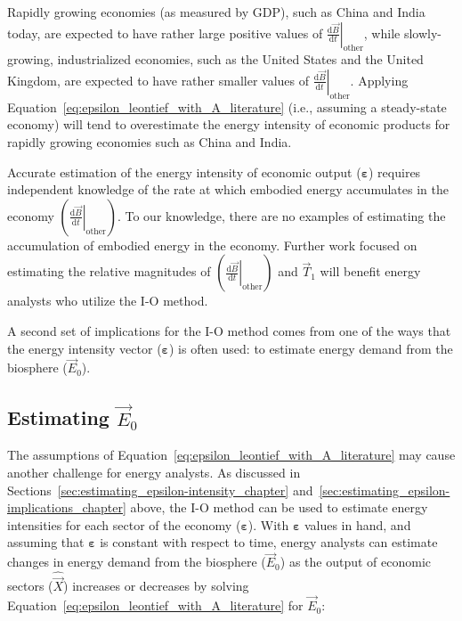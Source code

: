 Rapidly growing economies (as measured by GDP), such as China and India today,
are expected to have rather large positive values of 
$\left. \frac{\mathrm{d}\vec{B}}{\mathrm{d}t} \right|_{\mathrm{other}}$,
while slowly-growing, industrialized economies, 
such as the United States and the United Kingdom,
are expected to have rather smaller values of 
$\left. \frac{\mathrm{d}\vec{B}}{\mathrm{d}t} \right|_{\mathrm{other}}$.
Applying Equation~\ref{eq:epsilon_leontief_with_A_literature} 
(i.e., assuming a steady-state economy)
will tend to overestimate the energy intensity 
of economic products for rapidly growing economies such as China and India.

Accurate estimation of the energy intensity of economic output ($\bm{\varepsilon}$)
requires independent knowledge of the rate 
at which embodied energy accumulates in the economy 
$\left( \left. \frac{\mathrm{d}\vec{B}}{\mathrm{d}t} \right|_{\mathrm{other}} \right)$. 
To our knowledge, there are no examples of estimating the accumulation 
of embodied energy in the economy. 
Further work focused on estimating the relative magnitudes of 
$\left( \left. \frac{\mathrm{d}\vec{B}}{\mathrm{d}t} \right|_{\mathrm{other}} \right)$
and $\vec{T}_{1}$ will benefit energy analysts who utilize the I-O method.

A second set of implications for the I-O method 
comes from one of the ways that 
the energy intensity vector ($\bm{\varepsilon}$)
is often used: to estimate energy demand from the biosphere ($\vec{E}_{0}$).


\subsection{Estimating $\vec{E}_{0}$}

The assumptions of Equation~\ref{eq:epsilon_leontief_with_A_literature}
may cause another challenge for energy analysts. 
As discussed in Sections~\ref{sec:estimating_epsilon-intensity_chapter} 
and~\ref{sec:estimating_epsilon-implications_chapter} above, 
the I-O method can be used to estimate energy intensities 
for each sector of the economy ($\bm{\varepsilon}$). 
With $\bm{\varepsilon}$ values in hand,
and assuming that $\bm{\varepsilon}$ is constant with respect to time,
energy analysts can estimate changes in energy demand 
from the biosphere ($\vec{E}_{0}$) 
as the output of economic sectors ($\hat{\vec{X}}$) 
increases or decreases by solving 
Equation~\ref{eq:epsilon_leontief_with_A_literature} 
for $\vec{E}_{0}$:

